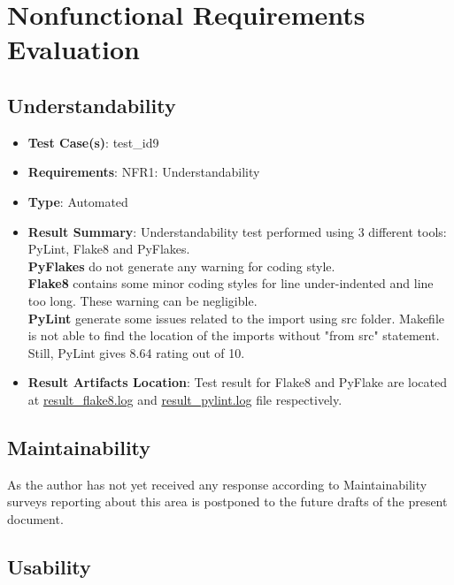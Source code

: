 \documentclass[12pt, titlepage]{article}
\begin{document}
\section{Nonfunctional Requirements Evaluation}

\subsection{Understandability}

\begin{itemize}
    \item \textbf{Test Case(s)}: test\_id9
    \item \textbf{Requirements}: NFR1: Understandability
    \item \textbf{Type}: Automated 
    \item \textbf{Result Summary}: Understandability test performed using 3 different tools: PyLint, Flake8 and PyFlakes. \\ \textbf{PyFlakes} do not generate any warning for coding style.\\ \textbf{Flake8} contains some minor coding styles for line under-indented and line too long. These warning can be negligible.\\ \textbf{PyLint} generate some issues related to the import using src folder. Makefile is not able to find the location of the imports without "from src" statement. Still, PyLint gives 8.64 rating out of 10.         
    \item \textbf{Result Artifacts Location}: Test result for Flake8 and PyFlake are located at \href{https://github.com/DeeshaPatel/CAS-741-Solar-Cooker/blob/2ff9134d70eff6a26c63ebc68b9c41ecd9457917/test/Non%20Functional%20Requirement/understandability/result_flake8.log}{result\_flake8.log} and \href{https://github.com/DeeshaPatel/CAS-741-Solar-Cooker/blob/2ff9134d70eff6a26c63ebc68b9c41ecd9457917/test/Non%20Functional%20Requirement/understandability/result_pylint.log}{result\_pylint.log} file respectively.
\end{itemize}

  
\subsection{Maintainability}

    As the author has not yet received any response according to Maintainability surveys reporting about this area is postponed to the future drafts of the present document. 

\subsection{Usability}
\end{document}
